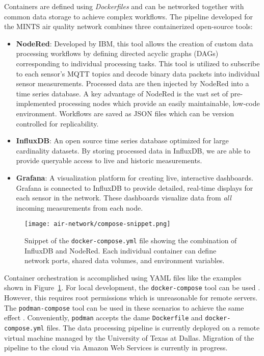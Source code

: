 Containers are defined using \textit{Dockerfiles} and can be networked together
with common data storage to achieve complex workflows. The pipeline developed
for the MINTS air quality network combines three containerized open-source tools:
\begin{itemize}
\item \textbf{NodeRed}: Developed by IBM, this tool allows the creation of
  custom data processing workflows by defining directed acyclic graphs (DAGs)
  corresponding to individual processing tasks. This tool is utilized to subscribe to
  each sensor's MQTT topics and decode binary data packets into individual
  sensor measurements. Processed data are then injected by NodeRed into a
  time series database. A key advantage of NodeRed is the vast set of
  pre-implemented processing nodes which provide an easily maintainable, low-code
  environment. Workflows are saved as JSON files which can be version controlled
  for replicability.
\item \textbf{InfluxDB}: An open source time series database optimized
  for large cardinality datasets. By storing processed data in InfluxDB, we are
  able to provide queryable access to live and historic measurements.
\item \textbf{Grafana}: A visualization platform for creating live, interactive
  dashboards. Grafana is connected to InfluxDB to provide detailed, real-time
  displays for each sensor in the network. These dashboards visualize data from
  \textit{all} incoming measurements from each node.
\end{itemize}

\begin{figure}[!h]
  \centering
  \texttt{[image: air-network/compose-snippet.png]}
  \caption{Snippet of the \texttt{docker-compose.yml} file showing the
    combination of InfluxDB and NodeRed. Each individual container can define
    network ports, shared data volumes, and environment variables.}
  \label{fig:compose}
\end{figure}

Container orchestration is accomplished using YAML files like the examples shown
in Figure~\ref{fig:compose}. For local development, the \texttt{docker-compose}
tool can be used \cite{docker-compose}. However, this requires root permissions
which is unreasonable for remote servers. The \texttt{podman-compose} tool can
be used in these scenarios to achieve the same effect \cite{podman-compose}.
Conveniently, \texttt{podman} accepts the dame \texttt{Dockerfile} and
\texttt{docker-compose.yml} files. The data processing pipeline is currently
deployed on a remote virtual machine managed by the University of Texas at
Dallas. Migration of the pipeline to the cloud via Amazon Web Services is
currently in progress.

